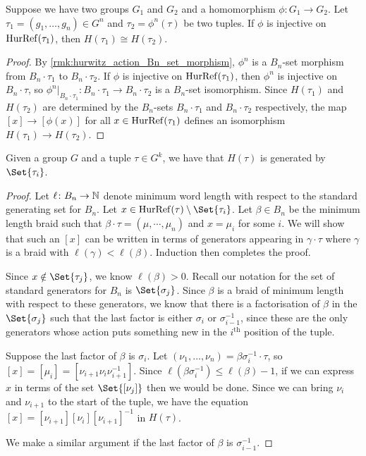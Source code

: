 \begin{lemma}
	\label{lem:inj_on_hurref_implies_iso_hurwitz_group}
	Suppose we have two groups $G_1$ and $G_2$ and a homomorphism $\phi \colon G_1 \to G_2$.
	Let $\tau_1 = (g_1,\ldots,g_n) \in G^n$ and $\tau_2 = \phi^n(\tau)$ be two tuples.
	If $\phi$ is injective on $\operatorname{HurRef}(\tau_1)$, then  $H(\tau_1) \cong H(\tau_2)$.
\end{lemma}
\begin{proof}
	By \cref{rmk:hurwitz_action_Bn_set_morphism}, $\phi^n$ is a $B_n$-set morphism from  $B_n \cdot \tau_1$ to $B_n \cdot \tau_2$.
	If $\phi$ is injective on $\operatorname{HurRef}(\tau_1)$, then $\phi^n$ is injective on  $B_n \cdot \tau$, so  $\phi^n|_{B_n\cdot \tau_1} \colon B_n \cdot \tau_1 \to B_n \cdot \tau_2$ is a  $B_n$-set isomorphism.
	Since $H(\tau_1)$ and  $H(\tau_2)$ are determined by the  $B_n$-sets  $B_n \cdot \tau_1$ and $B_n \cdot \tau_2$ respectively, the map $[x] \to [\phi(x)]$ for all $x \in \operatorname{HurRef}(\tau_1)$ defines an isomorphism  $H(\tau_1) \to H(\tau_2)$.
\end{proof}

\begin{lemma}
	\label{lem:hurwitz_group_generators}
	Given a group $G$ and a tuple $\tau \in G^k$, we have that $H(\tau)$ is generated by $\Set{\tau_i}$.
\end{lemma}
\begin{proof}
	Let $\ell \colon B_n \to \mathbb{N}$ denote minimum word length with respect to the standard generating set for $B_n$.
	Let $x \in \hurref(\tau) \setminus \Set{\tau_i}$.
	Let $\beta \in B_n$ be the minimum length braid such that $\beta \cdot \tau =(\mu,\cdots,\mu_n)$ and $x=\mu_i$ for some $i$.
	We will show that such an $[x]$ can be written in terms of generators appearing in $\gamma \cdot \tau$ where  $\gamma$ is a braid with $\ell(\gamma)<\ell(\beta)$.
	Induction then completes the proof.

	Since $x \notin \Set{\tau_j}$, we know $\ell(\beta)>0$.
	Recall our notation for the set of standard generators for $B_n$ is $\Set{\sigma_j}$.
	Since $\beta$ is a braid of minimum length with respect to these generators, we know that there is a factorisation of $\beta$ in the $\Set{\sigma_j} $ such that the last factor is either $\sigma_i$ or  $\sigma_{i-1}^{-1}$, since these are the only generators whose action puts something new in the $i^{\text{th}}$ position of the tuple.

	Suppose the last factor of $\beta$ is $\sigma_i$.
	Let $(\nu_1,\ldots,\nu_n) = \beta\sigma_i^{-1} \cdot \tau$, so $[x] = [\mu_i] = [\nu_{i+1}\nu_i\nu_{i+1}^{-1}]$.
	Since $\ell(\beta \sigma_i^{-1}) \leq \ell(\beta)-1$, if we can express $x$ in terms of the set $\Set{[\nu_j]}$ then we would be done.
	Since we can bring $\nu_i$ and  $\nu_{i+1}$ to the start of the tuple, we have the equation $[x]=[\nu_{i+1}][\nu_i][\nu_{i+1}]^{-1}$ in $H(\tau)$.

	We make a similar argument if the last factor of $\beta$ is  $\sigma_{i-1}^{-1}$.
\end{proof}

